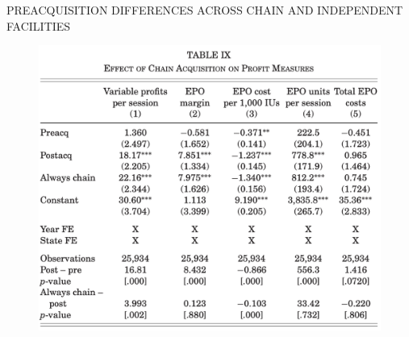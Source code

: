 \begin{frame}{PREACQUISITION DIFFERENCES ACROSS CHAIN AND INDEPENDENT FACILITIES}
\begin{figure}
    \centering
    \includegraphics[width=0.6\linewidth]{tb9.png}
\end{figure}
\end{frame}